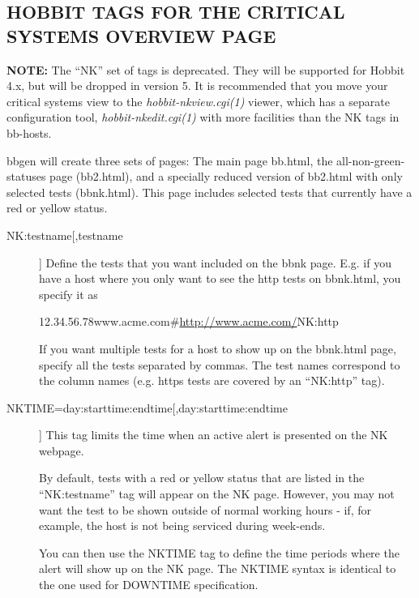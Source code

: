 \subsection{HOBBIT TAGS FOR THE CRITICAL SYSTEMS OVERVIEW PAGE}
\textbf{NOTE:}
 The ``NK'' set of tags is deprecated. They will be supported for
 Hobbit 4.x, but will be dropped in version 5. It is recommended that
 you move your critical systems view to the
 \emph{hobbit-nkview.cgi(1)} viewer, which has a separate
 configuration tool, \emph{hobbit-nkedit.cgi(1)} with more facilities
 than the NK tags in bb-hosts. 


  bbgen will create three sets of pages: The main page bb.html, the
  all-non-green-statuses page (bb2.html), and a specially reduced
  version of bb2.html with only selected tests (bbnk.html). This page
  includes selected tests that currently have a red or yellow status. 



 \begin{description}
\item[NK:testname[,testname]] Define the tests that you want included
  on the bbnk page. E.g. if you have a host where you only want to see
  the http tests on bbnk.html, you specify it as 


  
12.34.56.78www.acme.com\#\url{http://www.acme.com/}NK:http 


  If you want multiple tests for a host to show up on the bbnk.html
  page, specify all the tests separated by commas. The test names
  correspond to the column names (e.g. https tests are covered by an
  ``NK:http'' tag). 



 

\item[NKTIME=day:starttime:endtime[,day:starttime:endtime]] This tag limits the time when an active alert is presented on the NK webpage. 

  By default, tests with a red or yellow status that are listed in the
  ``NK:testname'' tag will appear on the NK page. However, you may not
  want the test to be shown outside of normal working hours - if, for
  example, the host is not being serviced during week-ends. 



  You can then use the NKTIME tag to define the time periods where the
  alert will show up on the NK page. The NKTIME syntax is identical to
  the one used for DOWNTIME specification. 


\end{description}

